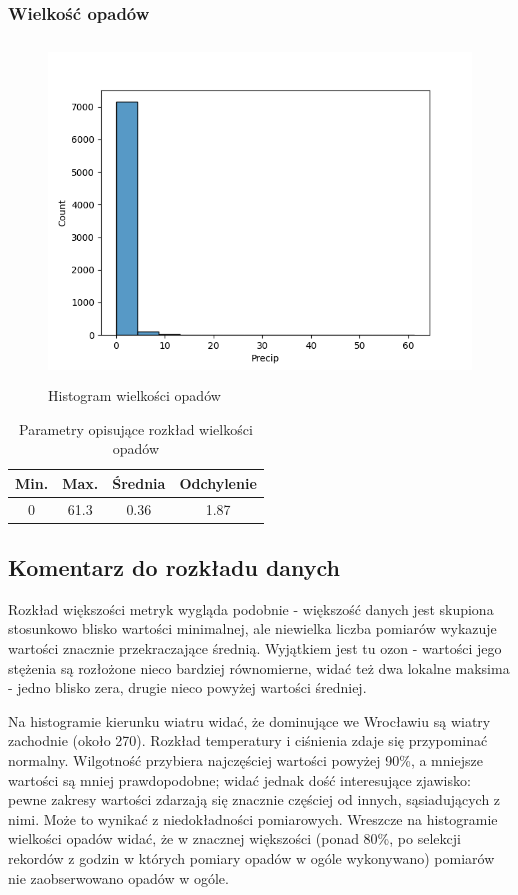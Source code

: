 \documentclass[18pt, letterpaper]{article}
\begin{document}
\subsubsection{Wielkość opadów}
\begin{figure}[H]
\centering
\includegraphics[width=120mm, height=90mm]{visualisations/histograms/Precip_hist.png}
\caption{Histogram wielkości opadów}
\end{figure}
\begin{table}[H]
\centering
\begin{tabular}{|c|c|c|c|}
\hline
Min.  & Max. & Średnia & Odchylenie \\ \hline
0 & 61.3 & 0.36   & 1.87      \\ \hline
\end{tabular}
\caption{Parametry opisujące rozkład wielkości opadów}
\end{table}

\subsection{Komentarz do rozkładu danych}
Rozkład większości metryk wygląda podobnie - większość danych jest skupiona stosunkowo blisko wartości minimalnej, ale niewielka liczba pomiarów wykazuje wartości znacznie przekraczające średnią.
Wyjątkiem jest tu ozon - wartości jego stężenia są rozłożone nieco bardziej równomierne, widać też dwa lokalne maksima - jedno blisko zera, drugie nieco powyżej wartości średniej.

Na histogramie kierunku wiatru widać, że dominujące we Wrocławiu są wiatry zachodnie (około 270\degree). Rozkład temperatury i ciśnienia zdaje się przypominać normalny. Wilgotność przybiera najczęściej wartości powyżej 90\%, a mniejsze wartości są mniej prawdopodobne; widać jednak dość interesujące zjawisko: pewne zakresy wartości zdarzają się znacznie częściej od innych, sąsiadujących z nimi. Może to wynikać z niedokładności pomiarowych. Wreszcze na histogramie wielkości opadów widać, że w znacznej większości (ponad 80\%, po selekcji rekordów z godzin w których pomiary opadów w ogóle wykonywano) pomiarów nie zaobserwowano opadów w ogóle.
\end{document}
